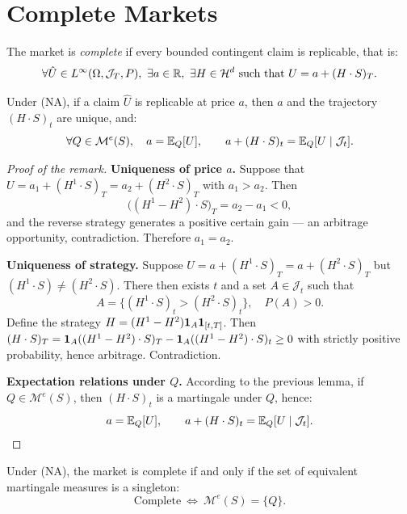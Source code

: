 \chapter{Complete Markets}

\begin{definition}
The market is \emph{complete} if every bounded contingent claim is replicable, that is:
\begin{equation}
\forall \hat U \in L^\infty(\Omega,\mathcal{J}_T,P),\ \exists a\in\mathbb{R},\ \exists H\in\mathcal{H}^d
\text{ such that } U = a + (H\cdot S)_T.
\end{equation}
\end{definition}

\begin{remark}
Under (NA), if a claim $\hat U$ is replicable at price $a$, then $a$ and the trajectory $(H\cdot S)_t$ are unique, and:
\[
\forall Q\in\mathcal{M}^e(S),\quad
a = \mathbb{E}_Q[U], \qquad a + (H\cdot S)_t = \mathbb{E}_Q[U \mid \mathcal{J}_t].
\]
\end{remark}

\begin{proof}[Proof of the remark]
\textbf{Uniqueness of price $a$.}  
Suppose that $U=a_1+(H^1\cdot S)_T=a_2+(H^2\cdot S)_T$ with $a_1>a_2$.  
Then
\[
\big((H^1 - H^2)\cdot S\big)_T = a_2 - a_1 < 0,
\]
and the reverse strategy generates a positive certain gain — an arbitrage opportunity, contradiction.  
Therefore $a_1=a_2$.

\smallskip
\textbf{Uniqueness of strategy.}  
Suppose $U=a+(H^1\cdot S)_T=a+(H^2\cdot S)_T$ but $(H^1\cdot S)\neq(H^2\cdot S)$.  
There then exists $t$ and a set $A\in\mathcal{J}_t$ such that
\[
A = \{(H^1\cdot S)_t > (H^2\cdot S)_t\},\quad P(A)>0.
\]
Define the strategy $H = (H^1-H^2)\mathbf{1}_A \mathbf{1}_{[t,T]}$.  
Then $(H\cdot S)_T = \mathbf{1}_A((H^1-H^2)\cdot S)_T - \mathbf{1}_A((H^1-H^2)\cdot S)_t \ge 0$ with strictly positive probability, hence arbitrage. Contradiction.

\smallskip
\textbf{Expectation relations under $Q$.}  
According to the previous lemma, if $Q\in\mathcal{M}^e(S)$, then $(H\cdot S)_t$ is a martingale under $Q$, hence:
\[
a = \mathbb{E}_Q[U],\qquad a + (H\cdot S)_t = \mathbb{E}_Q[U\mid\mathcal{J}_t].
\]
\end{proof}

\begin{theorem}
\label{thm:complet_singleton}
Under (NA), the market is complete if and only if the set of equivalent martingale measures is a singleton:
\begin{equation}
\text{Complete} \ \Longleftrightarrow\ \mathcal{M}^e(S)=\{Q\}.
\end{equation}
\end{theorem}

